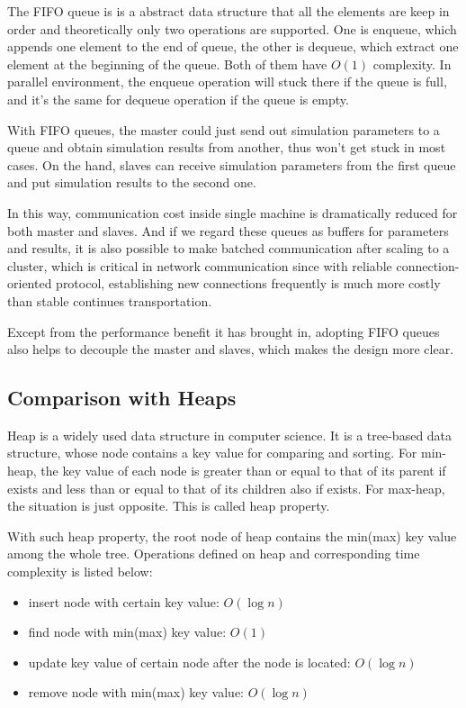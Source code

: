 \documentclass[12pt,a4]{report}
\begin{document}
The FIFO queue is is a abstract data structure that all the elements are keep in order and theoretically only two operations are supported. One is enqueue, which appends one element to the end of queue, the other is dequeue, which extract one element at the beginning of the queue. Both of them have $O(1)$ complexity. In parallel environment, the enqueue operation will stuck there if the queue is full, and it's the same for dequeue operation if the queue is empty.

With FIFO queues, the master could just send out simulation parameters to a queue and obtain simulation results from another, thus won't get stuck in most cases. On the hand, slaves can receive simulation parameters from the first queue and put simulation results to the second one.

In this way, communication cost inside single machine is dramatically reduced for both master and slaves. And if we regard these queues as buffers for parameters and results, it is also possible to make batched communication after scaling to a cluster, which is critical in network communication since with reliable connection-oriented protocol, establishing new connections frequently is much more costly than stable continues transportation.

Except from the performance benefit it has brought in, adopting FIFO queues also helps to decouple the master and slaves, which makes the design more clear.

\subsection{Comparison with Heaps}

Heap is a widely used data structure in computer science. It is a tree-based data structure, whose node contains a key value for comparing and sorting. For min-heap, the key value of each node is greater than or equal to that of its parent if exists and less than or equal to that of its children also if exists. For max-heap, the situation is just opposite. This is called heap property.

With such heap property, the root node of heap contains the min(max) key value among the whole tree. Operations defined on heap and corresponding time complexity is listed below:

\begin{itemize}
\item insert node with certain key value: $O(\log n)$
\item find node with min(max) key value: $O(1)$
\item update key value of certain node after the node is located: $O(\log n)$
\item remove node with min(max) key value: $O(\log n)$
\end{itemize}
\end{document}
